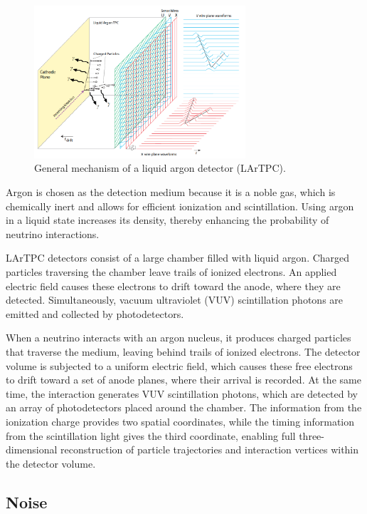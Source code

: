 \documentclass{pracalicmgr}
\begin{document}
\begin{figure}[H]
    \centering
    \includegraphics[width=0.7\textwidth]{src/LAr_diagram_DUNE.png}
    \caption{General mechanism of a liquid argon detector (LArTPC).}
\end{figure}

Argon is chosen as the detection medium because it is a noble gas, which is chemically inert and allows for efficient ionization and scintillation. Using argon in a liquid state increases its density, thereby enhancing the probability of neutrino interactions.

LArTPC detectors consist of a large chamber filled with liquid argon. Charged particles traversing the chamber leave trails of ionized electrons. An applied electric field causes these electrons to drift toward the anode, where they are detected. Simultaneously, vacuum ultraviolet (VUV) scintillation photons are emitted and collected by photodetectors.

When a neutrino interacts with an argon nucleus, it produces charged particles that traverse the medium, leaving behind trails of ionized electrons. The detector volume is subjected to a uniform electric field, which causes these free electrons to drift toward a set of anode planes, where their arrival is recorded. At the same time, the interaction generates VUV scintillation photons, which are detected by an array of photodetectors placed around the chamber. The information from the ionization charge provides two spatial coordinates, while the timing information from the scintillation light gives the third coordinate, enabling full three-dimensional reconstruction of particle trajectories and interaction vertices within the detector volume.

\subsection{Noise}
\end{document}
